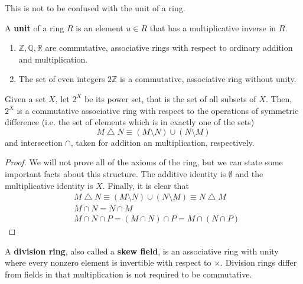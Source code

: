 \documentclass{article}
\begin{document}
    This is not to be confused with the unit of a ring. 

    \begin{definition}[Unit]
      A \textbf{unit} of a ring $R$ is an element $u \in R$ that has a multiplicative inverse in $R$. 
    \end{definition}

    \begin{example} 
      \begin{enumerate}
        \item $\mathbb{Z}, \mathbb{Q}, \mathbb{R}$ are commutative, associative rings with respect to ordinary addition and multiplication.
        \item The set of even integers $2\mathbb{Z}$ is a commutative, associative ring without unity.
      \end{enumerate}
    \end{example}

    \begin{proposition}
      Given a set $X$, let $2^X$ be its power set, that is the set of all subsets of $X$. Then, $2^X$ is a commutative associative ring with respect to the operations of symmetric difference (i.e. the set of elements which is in exactly one of the sets) 
      \begin{equation}
        M \bigtriangleup N \equiv (M \setminus N) \cup (N \setminus M)
      \end{equation}
      and intersection $\cap$, taken for addition an multiplication, respectively. 
    \end{proposition}
    \begin{proof}
      We will not prove all of the axioms of the ring, but we can state some important facts about this structure. The additive identity is $\emptyset$ and the multiplicative identity is $X$. Finally, it is clear that 
      \begin{align*}
        & M \bigtriangleup N \equiv (M \setminus N) \cup (N \setminus M) \equiv N \bigtriangleup M \\
        & M \cap N = N \cap M \\
        & M \cap N \cap P = (M \cap N) \cap P = M \cap (N \cap P)
      \end{align*}
    \end{proof}

    \begin{example}
      A \textbf{division ring}, also called a \textbf{skew field}, is an associative ring with unity where every nonzero element is invertible with respect to $\times$. Division rings differ from fields in that multiplication is not required to be commutative. 
    \end{example}
\end{document}
